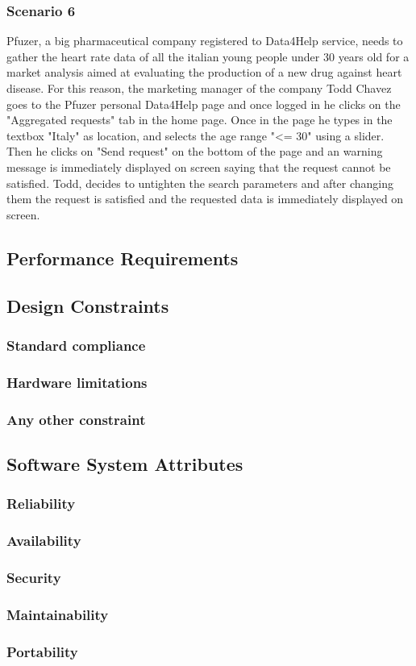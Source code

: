 \subsubsection{Scenario 6}
Pfuzer, a big pharmaceutical company registered to Data4Help service, needs to gather the heart rate data of all the italian young people under 30 years old for a market analysis aimed at evaluating the production of a new drug against heart disease. For this reason, the marketing manager of the company Todd Chavez goes to the Pfuzer personal Data4Help page and once logged  in he clicks on the "Aggregated requests" tab in the home page. Once in the page he types in the textbox "Italy" as location, and selects the age range "<= 30" using a slider. Then he clicks on "Send request" on the bottom of the page and an warning message is immediately displayed on screen saying that the request cannot be satisfied. Todd, decides to untighten the search parameters and after changing them the request is satisfied and the requested data is immediately displayed on screen. 
\subsection{Performance Requirements}
\subsection{Design Constraints}
\subsubsection{Standard compliance}
\subsubsection{Hardware limitations}
\subsubsection{Any other constraint}
\subsection{Software System Attributes}
\subsubsection{Reliability}
\subsubsection{Availability}
\subsubsection{Security}
\subsubsection{Maintainability}
\subsubsection{Portability}
